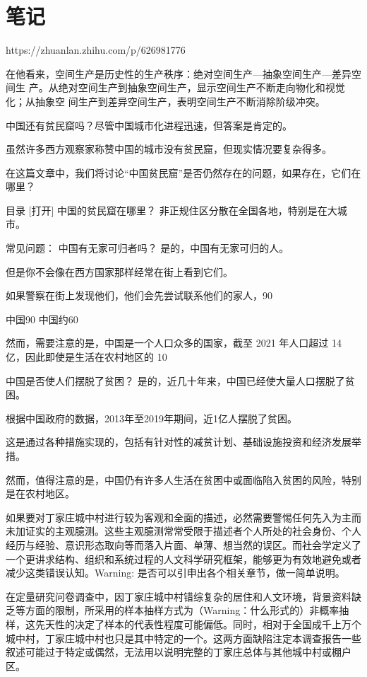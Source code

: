 \chapter{笔记}
\label{cha:notes}

https://zhuanlan.zhihu.com/p/626981776

在他看来，空间生产是历史性的生产秩序：绝对空间生产—抽象空间生产—差异空间生
产。从绝对空间生产到抽象空间生产，显示空间生产不断走向物化和视觉化；从抽象空
间生产到差异空间生产，表明空间生产不断消除阶级冲突。

中国还有贫民窟吗？尽管中国城市化进程迅速，但答案是肯定的。

虽然许多西方观察家称赞中国的城市没有贫民窟，但现实情况要复杂得多。

在这篇文章中，我们将讨论“中国贫民窟”是否仍然存在的问题，如果存在，它们在哪里？

目录
[打开]
中国的贫民窟在哪里？
非正规住区分散在全国各地，特别是在大城市。


常见问题：
中国有无家可归者吗？
是的，中国有无家可归的人。

但是你不会像在西方国家那样经常在街上看到它们。

如果警察在街上发现他们，他们会先尝试联系他们的家人，90%

中国90%
中国约60%

然而，需要注意的是，中国是一个人口众多的国家，截至 2021 年人口超过 14 亿，因此即使是生活在农村地区的 10%

中国是否使人们摆脱了贫困？
是的，近几十年来，中国已经使大量人口摆脱了贫困。

根据中国政府的数据，2013年至2019年期间，近1亿人摆脱了贫困。

这是通过各种措施实现的，包括有针对性的减贫计划、基础设施投资和经济发展举措。

然而，值得注意的是，中国仍有许多人生活在贫困中或面临陷入贫困的风险，特别是在农村地区。


如果要对丁家庄城中村进行较为客观和全面的描述，必然需要警惕任何先入为主而未加证实的主观臆测。这些主观臆测常常受限于描述者个人所处的社会身份、个人经历与经验、意识形态取向等而落入片面、单薄、想当然的误区。而社会学定义了一个更讲求结构、组织和系统过程的人文科学研究框架，能够更为有效地避免或者减少这类错误认知。Warning: 是否可以引申出各个相关章节，做一简单说明。

在定量研究问卷调查中，因丁家庄城中村错综复杂的居住和人文环境，背景资料缺乏等方面的限制，所采用的样本抽样方式为（Warning：什么形式的）非概率抽样，这先天性的决定了样本的代表性程度可能偏低。同时，相对于全国成千上万个城中村，丁家庄城中村也只是其中特定的一个。这两方面缺陷注定本调查报告一些叙述可能过于特定或偶然，无法用以说明完整的丁家庄总体与其他城中村或棚户区。

